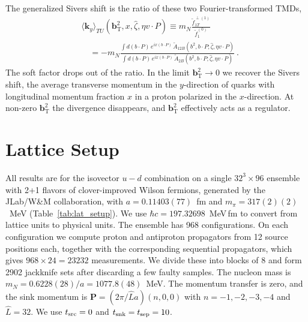 \documentclass[aps,prd,twocolumn,amsmath,amssymb,floatfix]{revtex4-2}
\newcommand{\tAmp}{\widetilde{A}}
\newcommand{\vect}[1]{\ensuremath{\boldsymbol{#1}}}
\newcommand{\vprp}[1]{\vect{#1}_{\mathrm T}}
\newcommand{\tcdot}{{\cdot}}
\newcommand{\bvec}{b}
\newcommand{\mN}{m_N}
\newcommand{\zetahat}{{\hat \zeta}}
\begin{document}
The generalized Sivers shift is the ratio of these two Fourier-transformed TMDs,
\begin{align}
	&\langle \vect{k}_y \rangle_{TU}(\vprp{\bvec}^2,x,\zetahat,\eta v \tcdot P)
	\equiv \mN \frac{\tilde f_{1T}^{\perp(1)}}{\tilde f_1^{(0)}} \nonumber\\
	&\quad = -\mN \frac{\int d(\bvec\tcdot P)\,e^{ix(\bvec\tcdot P)}\, \tAmp_{12B}(\bvec^2,\bvec \tcdot P;\zetahat,\eta v \tcdot P)}{\int d(\bvec\tcdot P)\,e^{ix(\bvec\tcdot P)}\,\tAmp_{2B}(\bvec^2,\bvec \tcdot P;\zetahat,\eta v \tcdot P)}\ .
	\label{eq-genSivShift}
\end{align}
The soft factor drops out of the ratio. In the limit $\vprp{\bvec}^2\to0$ we recover the Sivers shift, the average transverse momentum in the $y$-direction of quarks with longitudinal momentum fraction $x$ in a proton polarized in the $x$-direction. At non-zero $\vprp{\bvec}^2$ the divergence disappears, and $\vprp{\bvec}^2$ effectively acts as a regulator.

\section{Lattice Setup}
\label{sec:setup}
All results are for the isovector $u-d$ combination on a single $32^3\times96$ ensemble with 2+1 flavors of clover-improved Wilson fermions, generated by the JLab/W\&M collaboration, with $a=0.11403(77)$~fm and $m_\pi=317(2)(2)$~MeV (Table~\ref{tab:lat_setup}). We use $\hbar c=197.32698$~MeV\,fm to convert from lattice units to physical units. The ensemble has 968 configurations. On each configuration we compute proton and antiproton propagators from 12 source positions each, together with the corresponding sequential propagators, which gives $968\times24=23232$ measurements. We divide these into blocks of 8 and form 2902 jackknife sets after discarding a few faulty samples. The nucleon mass is $m_N=0.6228(28)/a=1077.8(48)$~MeV. The momentum transfer is zero, and the sink momentum is $\vect{P}=(2\pi/\hat L a)(n,0,0)$ with $n=-1,-2,-3,-4$ and $\hat L=32$. We use $t_{\rm src}=0$ and $t_{\rm snk}=t_{\rm sep}=10$.
\end{document}
